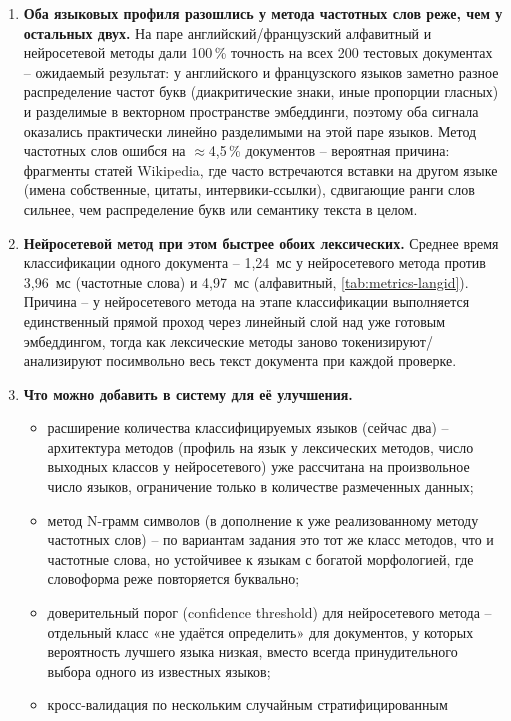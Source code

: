 \begin{enumerate}
  \item \textbf{Оба языковых профиля разошлись у метода частотных
  слов реже, чем у остальных двух.} На паре английский/французский
  алфавитный и нейросетевой методы дали 100\,\% точность на всех 200
  тестовых документах -- ожидаемый результат: у английского и
  французского языков заметно разное распределение частот букв
  (диакритические знаки, иные пропорции гласных) и разделимые в
  векторном пространстве эмбеддинги, поэтому оба сигнала оказались
  практически линейно разделимыми на этой паре языков. Метод частотных
  слов ошибся на $\approx$4,5\,\% документов -- вероятная причина:
  фрагменты статей Wikipedia, где часто встречаются вставки на другом
  языке (имена собственные, цитаты, интервики-ссылки), сдвигающие
  ранги слов сильнее, чем распределение букв или семантику текста в
  целом.
  \item \textbf{Нейросетевой метод при этом быстрее обоих лексических.}
  Среднее время классификации одного документа -- 1{,}24~мс у
  нейросетевого метода против 3{,}96~мс (частотные слова) и 4{,}97~мс
  (алфавитный, \autoref{tab:metrics-langid}). Причина -- у нейросетевого
  метода на этапе классификации выполняется единственный прямой проход
  через линейный слой над уже готовым эмбеддингом, тогда как лексические
  методы заново токенизируют/анализируют посимвольно весь текст
  документа при каждой проверке.
  \item \textbf{Что можно добавить в систему для её улучшения.}
  \begin{itemize}
    \item расширение количества классифицируемых языков (сейчас два) --
    архитектура методов (профиль на язык у лексических методов, число
    выходных классов у нейросетевого) уже рассчитана на произвольное
    число языков, ограничение только в количестве размеченных данных;
    \item метод N-грамм символов (в дополнение к уже реализованному
    методу частотных слов) -- по вариантам задания это тот же класс
    методов, что и частотные слова, но устойчивее к языкам с богатой
    морфологией, где словоформа реже повторяется буквально;
    \item доверительный порог (confidence threshold) для нейросетевого
    метода -- отдельный класс «не удаётся определить» для документов, у
    которых вероятность лучшего языка низкая, вместо всегда
    принудительного выбора одного из известных языков;
    \item кросс-валидация по нескольким случайным стратифицированным

\end{itemize}
\end{enumerate}
